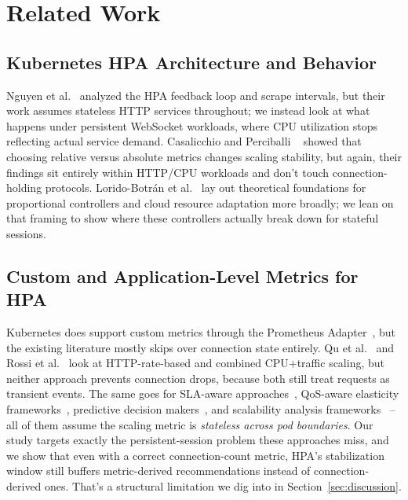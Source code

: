 \documentclass[twocolumn]{svjour3}
\begin{document}
\section{Related Work}
\label{sec:related}

\subsection{Kubernetes HPA Architecture and Behavior}

Nguyen et al.~\cite{nguyen2020hpa} analyzed the HPA feedback loop and scrape
intervals, but their work assumes stateless HTTP services throughout; we instead
look at what happens under persistent WebSocket workloads, where CPU utilization
stops reflecting actual service demand. Casalicchio and Perciballi
~\cite{casalicchio2019auto} showed that choosing relative versus absolute metrics
changes scaling stability, but again, their findings sit entirely within
HTTP/CPU workloads and don't touch connection-holding protocols. Lorido-Botr{\'a}n
et al.~\cite{lorido2014auto,lorido2016adaptation} lay out theoretical foundations
for proportional controllers and cloud resource adaptation more broadly; we lean on
that framing to show where these controllers actually break down for stateful
sessions.

\subsection{Custom and Application-Level Metrics for HPA}

Kubernetes does support custom metrics through the Prometheus
Adapter~\cite{prometheus_adapter}, but the existing literature mostly skips over
connection state entirely. Qu et al.~\cite{qu2018auto} and Rossi et
al.~\cite{rossi2020horizontal} look at HTTP-rate-based and combined CPU+traffic
scaling, but neither approach prevents connection drops, because both still treat
requests as transient events. The same goes for SLA-aware
approaches~\cite{biswas2017hybrid}, QoS-aware elasticity
frameworks~\cite{tsagkaropoulos2021severity}, predictive decision
makers~\cite{nikravesh2018genetic}, and scalability analysis
frameworks~\cite{alsaid2019scalability} -- all of them assume the scaling metric is
\textit{stateless across pod boundaries}. Our study targets exactly the
persistent-session problem these approaches miss, and we show that even with a
correct connection-count metric, HPA's stabilization window still buffers
metric-derived recommendations instead of connection-derived ones. That's a
structural limitation we dig into in Section~\ref{sec:discussion}.
\end{document}
